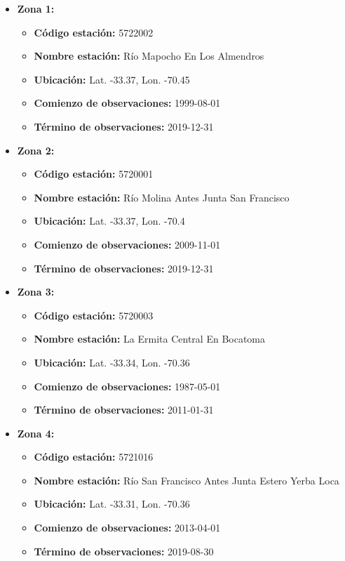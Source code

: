 \documentclass{article} %
\begin{document}
\begin{itemize}
    \item \textbf{Zona 1:}
    \begin{itemize}
        \item \textbf{Código estación:} 5722002
        \item \textbf{Nombre estación:} Río Mapocho En Los Almendros
        \item \textbf{Ubicación:} Lat. -33.37, Lon. -70.45
        \item \textbf{Comienzo de observaciones:} 1999-08-01
        \item \textbf{Término de observaciones:} 2019-12-31
    \end{itemize}

    \item \textbf{Zona 2:}
    \begin{itemize}
        \item \textbf{Código estación:} 5720001
        \item \textbf{Nombre estación:} Río Molina Antes Junta San Francisco
        \item \textbf{Ubicación:} Lat. -33.37, Lon. -70.4
        \item \textbf{Comienzo de observaciones:} 2009-11-01
        \item \textbf{Término de observaciones:} 2019-12-31
    \end{itemize}

    \item \textbf{Zona 3:}
    \begin{itemize}
        \item \textbf{Código estación:} 5720003
        \item \textbf{Nombre estación:} La Ermita Central En Bocatoma
        \item \textbf{Ubicación:} Lat. -33.34, Lon. -70.36
        \item \textbf{Comienzo de observaciones:} 1987-05-01
        \item \textbf{Término de observaciones:} 2011-01-31
    \end{itemize}

    \item \textbf{Zona 4:}
    \begin{itemize}
        \item \textbf{Código estación:} 5721016
        \item \textbf{Nombre estación:} Río San Francisco Antes Junta Estero Yerba Loca
        \item \textbf{Ubicación:} Lat. -33.31, Lon. -70.36
        \item \textbf{Comienzo de observaciones:} 2013-04-01
        \item \textbf{Término de observaciones:} 2019-08-30
    \end{itemize}


\end{itemize}
\end{document}
